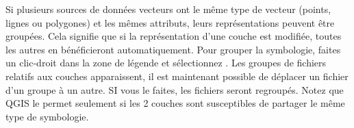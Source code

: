 

Si plusieurs sources de données vecteurs ont le même type de vecteur (points, lignes ou polygones) et les mêmes attributs, leurs représentations peuvent être groupées. Cela signifie que si la représentation d'une couche est modifiée, toutes les autres en bénéficieront automatiquement. Pour grouper la symbologie, faites un clic-droit dans la zone de légende et sélectionnez . Les groupes de fichiers relatifs aux couches apparaissent, il est maintenant possible de déplacer un fichier d'un groupe à un autre. SI vous le faites, les fichiers seront regroupés. Notez que QGIS le permet seulement si les 2 couches sont susceptibles de partager le même type de symbologie.


%


